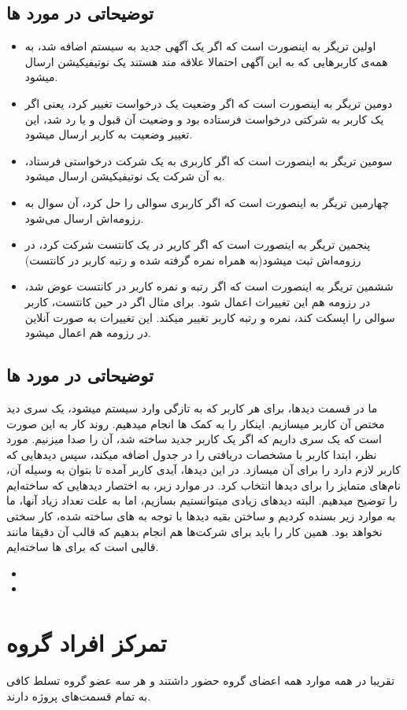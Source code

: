 \documentclass{article}
\begin{document}
    \subsection{توضیحاتی در مورد ها}
        \begin{itemize}
            \item اولین تریگر به اینصورت است که اگر یک آگهی جدید به سیستم اضافه شد، به همه‌ی کاربرهایی که به این آگهی احتمالا علاقه مند هستند یک نوتیفیکیشن ارسال میشود.
            \item دومین تریگر به اینصورت است که اگر وضعیت یک درخواست تغییر کرد، یعنی اگر یک کاربر به شرکتی درخواست فرستاده بود و وضعیت آن قبول و یا رد شد، این تغییر وضعیت به کاربر ارسال میشود.
            \item سومین تریگر به اینصورت است که اگر کاربری به یک شرکت درخواستی فرستاد، به آن شرکت یک نوتیفیکیشن ارسال میشود.
            \item چهارمین تریگر به اینصورت است که اگر کاربری سوالی را حل کرد، آن سوال به رزومه‌اش ارسال می‌شود.
            \item پنجمین تریگر به اینصورت است که اگر کاربر در یک کانتست شرکت کرد، در رزومه‌اش ثبت میشود(به همراه نمره گرفته شده و رتبه کاربر در کانتست)
            \item ششمین تریگر به اینصورت است که اگر رتبه و نمره کاربر در کانتست عوض شد، در رزومه هم این تغییرات اعمال شود. برای مثال اگر در حین کانتست، کاربر سوالی را اپسکت کند، نمره و رتبه کاربر تغییر میکند. این تغییرات به صورت آنلاین در رزومه هم اعمال میشود.
        \end{itemize}
    \subsection{توضیحاتی در مورد ها}
        ما در قسمت دیدها، برای هر کاربر که به تازگی وارد سیستم میشود، یک سری دید مختص آن کاربر میسازیم. اینکار را به کمک ها انجام میدهیم.
        روند کار به این صورت است که یک سری  داریم که اگر یک کاربر جدید ساخته شد، آن را صدا میزنیم.  مورد نظر، ابتدا کاربر با مشخصات دریافتی را در جدول  اضافه میکند، سپس دیدهایی که کاربر لازم دارد را برای آن میسازد.
        در این دیدها، آیدی کاربر آمده تا بتوان به وسیله آن، نام‌های متمایز را برای دیدها انتخاب کرد. در موارد زیر، به اختصار دیدهایی که ساخته‌ایم را توضیح میدهیم.
        البته دیدهای زیادی میتوانستیم بسازیم، اما به علت تعداد زیاد آنها، ما به موارد زیر بسنده کردیم و ساختن بقیه دیدها با توجه به های ساخته شده، کار سختی نخواهد بود.
        همین کار را باید برای شرکت‌ها هم انجام بدهیم که قالب آن دقیقا مانند قالبی است که برای ها ساخته‌ایم.
        \begin{itemize}
            \item
            \item
        \end{itemize}

\section{تمرکز افراد گروه}
تقریبا در همه موارد همه اعضای گروه حضور داشتند و هر سه عضو گروه تسلط کافی به تمام قسمت‌های پروژه دارند.
\end{document}
